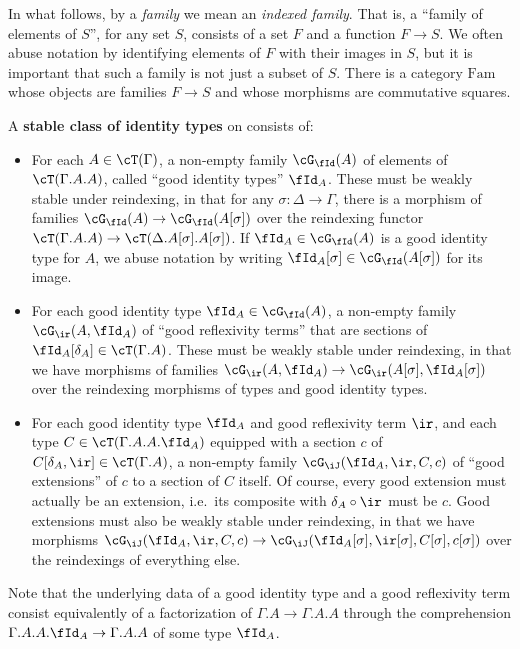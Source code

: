 \documentclass[referee]{psp}
\let\J\iJ
\let\C\cC
\let\T\cT
\let\r\ir
\let\Id\fId
\let\G\cG
\begin{document}
In what follows, by a \emph{family} we mean an \emph{indexed family}.
That is, a ``family of elements of $S$'', for any set $S$, consists of a set $F$ and a function $F\to S$.
We often abuse notation by identifying elements of $F$ with their images in $S$, but it is important that such a family is not just a subset of $S$.
There is a category $\mathrm{Fam}$ whose objects are families $F\to S$ and whose morphisms are commutative squares.

\begin{defn}\label{defn:id}
  A \textbf{stable class of identity types} on \C consists of:
  \begin{itemize}
  \item For each $A\in \T(\Gamma)$, a non-empty family $\G_\Id(A)$ of elements of $\T(\Gamma.A.A)$, called ``good identity types'' $\Id_A$.
    These must be weakly stable under reindexing, in that for any $\sigma:\Delta\to\Gamma$, there is a morphism of families $\G_\Id(A) \to \G_\Id(A[\sigma])$ over the reindexing functor $\T(\Gamma.A.A) \to \T(\Delta.A[\sigma].A[\sigma])$.
    If $\Id_A\in\G_\Id(A)$ is a good identity type for $A$, we abuse notation by writing $\Id_A[\sigma] \in \G_\Id(A[\sigma])$ for its image.
  \item For each good identity type $\Id_A\in\G_\Id(A)$, a non-empty family $\G_\r(A,\Id_A)$ of ``good reflexivity terms'' that are sections of $\Id_A[\delta_A] \in \T(\Gamma.A)$.
    These must be weakly stable under reindexing, in that we have morphisms of families $\G_\r(A,\Id_A) \to \G_\r(A[\sigma],\Id_A[\sigma])$ over the reindexing morphisms of types and good identity types.
  \item For each good identity type $\Id_A$ and good reflexivity term $\r$, and each type $C\in\T(\Gamma.A.A.\Id_A)$ equipped with a section $c$ of $C[\delta_A,\r]\in\T(\Gamma.A)$, a non-empty family $\G_\J(\Id_A,\r,C,c)$ of ``good extensions'' of $c$ to a section of $C$ itself.
    Of course, every good extension must actually be an extension, i.e.\ its composite with $\delta_A \circ \r$ must be $c$.
    Good extensions must also be weakly stable under reindexing, in that we have morphisms $\G_\J(\Id_A,\r,C,c) \to \G_\J(\Id_A[\sigma],\r[\sigma],C[\sigma],c[\sigma])$ over the reindexings of everything else.
  \end{itemize}
\end{defn}

Note that the underlying data of a good identity type and a good reflexivity term consist equivalently of a factorization of $\Gamma.A \to \Gamma.A.A$ through the comprehension $\Gamma.A.A.\Id_A \to \Gamma.A.A$ of some type $\Id_A$.
\end{document}
